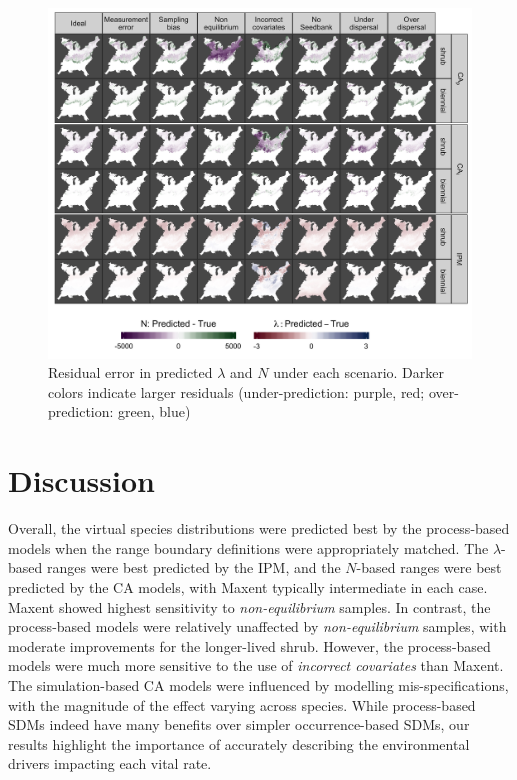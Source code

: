 \documentclass[preprint,review,times,12pt]{elsarticle}
\begin{document}
\begin{figure}
	\centering\includegraphics[width=\linewidth]{figs/map_N_Lambda.jpg}
	\caption{\label{fig:N_Lambda} Residual error in predicted $\lambda$ and $N$ under each scenario. Darker colors indicate larger residuals (under-prediction: purple, red; over-prediction: green, blue)}
\end{figure}


\section{Discussion}
\label{S:4}

Overall, the virtual species distributions were predicted best by the process-based models when the range boundary definitions were appropriately matched. The $\lambda$-based ranges were best predicted by the IPM, and the $N$-based ranges were best predicted by the CA models, with Maxent typically intermediate in each case. Maxent showed highest sensitivity to \emph{non-equilibrium} samples. In contrast, the process-based models were relatively unaffected by \emph{non-equilibrium} samples, with moderate improvements for the longer-lived shrub. However, the process-based models were much more sensitive to the use of \emph{incorrect covariates} than Maxent. The simulation-based CA models were influenced by modelling mis-specifications, with the magnitude of the effect varying across species. While process-based SDMs indeed have many benefits over simpler occurrence-based SDMs, our results highlight the importance of accurately describing the environmental drivers impacting each vital rate. 
\end{document}
